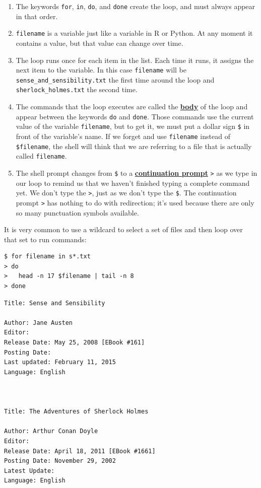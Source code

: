 \documentclass[
]{krantz}
\newcommand{\gref}[2]{\hyperlink{#2}{\textbf{#1}}}
\begin{document}
\begin{enumerate}
\def\labelenumi{\arabic{enumi}.}
\item
  The keywords \texttt{for}, \texttt{in}, \texttt{do}, and \texttt{done} create the loop,
  and must always appear in that order.
\item
  \texttt{filename} is a variable just like a variable in R or Python.
  At any moment it contains a value,
  but that value can change over time.
\item
  The loop runs once for each item in the list.
  Each time it runs,
  it assigns the next item to the variable.
  In this case \texttt{filename} will be \texttt{sense\_and\_sensibility.txt}
  the first time around the loop
  and \texttt{sherlock\_holmes.txt} the second time.
\item
  The commands that the loop executes are called the \gref{body}{loop\_body} of the loop
  and appear between the keywords \texttt{do} and \texttt{done}.
  Those commands use the current value of the variable \texttt{filename},
  but to get it,
  we must put a dollar sign \texttt{\$} in front of the variable's name.
  If we forget and use \texttt{filename} instead of \texttt{\$filename},
  the shell will think that we are referring to a file
  that is actually called \texttt{filename}.
\item
  The shell prompt changes from \texttt{\$}
  to a \gref{continuation prompt}{continuation\_prompt} \texttt{\textgreater{}}
  as we type in our loop
  to remind us that we haven't finished typing a complete command yet.
  We don't type the \texttt{\textgreater{}},
  just as we don't type the \texttt{\$}.
  The continuation prompt \texttt{\textgreater{}} has nothing to do with redirection;
  it's used because there are only so many punctuation symbols available.
\end{enumerate}

It is very common to use a wildcard to select a set of files
and then loop over that set to run commands:

\begin{verbatim}
$ for filename in s*.txt
> do
>   head -n 17 $filename | tail -n 8
> done
\end{verbatim}

\begin{verbatim}
Title: Sense and Sensibility

Author: Jane Austen
Editor:
Release Date: May 25, 2008 [EBook #161]
Posting Date:
Last updated: February 11, 2015
Language: English



Title: The Adventures of Sherlock Holmes

Author: Arthur Conan Doyle
Editor:
Release Date: April 18, 2011 [EBook #1661]
Posting Date: November 29, 2002
Latest Update:
Language: English
\end{verbatim}
\end{document}
